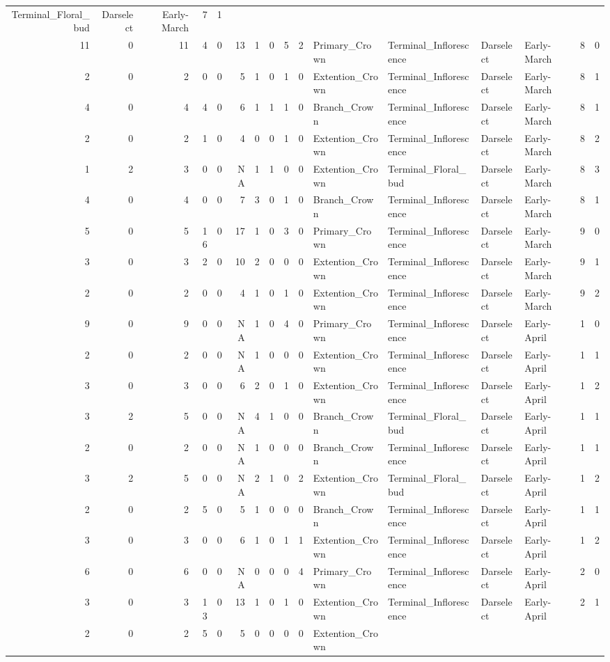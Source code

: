 \documentclass[]{article}
\begin{document}
\begin{longtable}[]{@{}rrrrrrrrrrllllrl@{}}
Terminal\_Floral\_bud & Darselect & Early-March & 7 & 1\tabularnewline
11 & 0 & 11 & 4 & 0 & 13 & 1 & 0 & 5 & 2 & Primary\_Crown &
Terminal\_Inflorescence & Darselect & Early-March & 8 & 0\tabularnewline
2 & 0 & 2 & 0 & 0 & 5 & 1 & 0 & 1 & 0 & Extention\_Crown &
Terminal\_Inflorescence & Darselect & Early-March & 8 & 1\tabularnewline
4 & 0 & 4 & 4 & 0 & 6 & 1 & 1 & 1 & 0 & Branch\_Crown &
Terminal\_Inflorescence & Darselect & Early-March & 8 & 1\tabularnewline
2 & 0 & 2 & 1 & 0 & 4 & 0 & 0 & 1 & 0 & Extention\_Crown &
Terminal\_Inflorescence & Darselect & Early-March & 8 & 2\tabularnewline
1 & 2 & 3 & 0 & 0 & NA & 1 & 1 & 0 & 0 & Extention\_Crown &
Terminal\_Floral\_bud & Darselect & Early-March & 8 & 3\tabularnewline
4 & 0 & 4 & 0 & 0 & 7 & 3 & 0 & 1 & 0 & Branch\_Crown &
Terminal\_Inflorescence & Darselect & Early-March & 8 & 1\tabularnewline
5 & 0 & 5 & 16 & 0 & 17 & 1 & 0 & 3 & 0 & Primary\_Crown &
Terminal\_Inflorescence & Darselect & Early-March & 9 & 0\tabularnewline
3 & 0 & 3 & 2 & 0 & 10 & 2 & 0 & 0 & 0 & Extention\_Crown &
Terminal\_Inflorescence & Darselect & Early-March & 9 & 1\tabularnewline
2 & 0 & 2 & 0 & 0 & 4 & 1 & 0 & 1 & 0 & Extention\_Crown &
Terminal\_Inflorescence & Darselect & Early-March & 9 & 2\tabularnewline
9 & 0 & 9 & 0 & 0 & NA & 1 & 0 & 4 & 0 & Primary\_Crown &
Terminal\_Inflorescence & Darselect & Early-April & 1 & 0\tabularnewline
2 & 0 & 2 & 0 & 0 & NA & 1 & 0 & 0 & 0 & Extention\_Crown &
Terminal\_Inflorescence & Darselect & Early-April & 1 & 1\tabularnewline
3 & 0 & 3 & 0 & 0 & 6 & 2 & 0 & 1 & 0 & Extention\_Crown &
Terminal\_Inflorescence & Darselect & Early-April & 1 & 2\tabularnewline
3 & 2 & 5 & 0 & 0 & NA & 4 & 1 & 0 & 0 & Branch\_Crown &
Terminal\_Floral\_bud & Darselect & Early-April & 1 & 1\tabularnewline
2 & 0 & 2 & 0 & 0 & NA & 1 & 0 & 0 & 0 & Branch\_Crown &
Terminal\_Inflorescence & Darselect & Early-April & 1 & 1\tabularnewline
3 & 2 & 5 & 0 & 0 & NA & 2 & 1 & 0 & 2 & Extention\_Crown &
Terminal\_Floral\_bud & Darselect & Early-April & 1 & 2\tabularnewline
2 & 0 & 2 & 5 & 0 & 5 & 1 & 0 & 0 & 0 & Branch\_Crown &
Terminal\_Inflorescence & Darselect & Early-April & 1 & 1\tabularnewline
3 & 0 & 3 & 0 & 0 & 6 & 1 & 0 & 1 & 1 & Extention\_Crown &
Terminal\_Inflorescence & Darselect & Early-April & 1 & 2\tabularnewline
6 & 0 & 6 & 0 & 0 & NA & 0 & 0 & 0 & 4 & Primary\_Crown &
Terminal\_Inflorescence & Darselect & Early-April & 2 & 0\tabularnewline
3 & 0 & 3 & 13 & 0 & 13 & 1 & 0 & 1 & 0 & Extention\_Crown &
Terminal\_Inflorescence & Darselect & Early-April & 2 & 1\tabularnewline
2 & 0 & 2 & 5 & 0 & 5 & 0 & 0 & 0 & 0 & Extention\_Crown &

\end{longtable}
\end{document}
